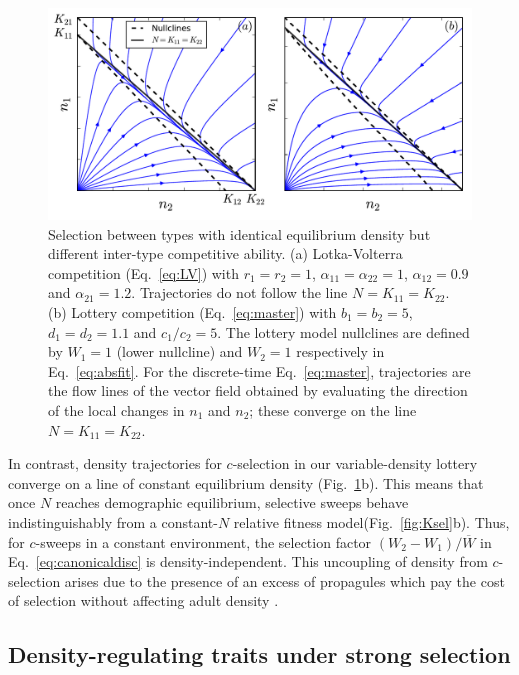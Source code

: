 \documentclass[12pt]{article}
\begin{document}
\begin{figure}
\centering
\includegraphics[scale=0.8]{LVvslottery.pdf}
\caption{\label{fig:LVvslottery} Selection between types with identical equilibrium density but different inter-type competitive ability. (a) Lotka-Volterra competition (Eq.~\ref{eq:LV}) with $r_1=r_2=1$, $\alpha_{11}=\alpha_{22}=1$, $\alpha_{12}=0.9$ and $\alpha_{21}=1.2$. Trajectories do not follow the line $N=K_{11}=K_{22}$. (b) Lottery competition (Eq.~\ref{eq:master}) with $b_1=b_2=5$, $d_1=d_2=1.1$ and $c_1/c_2=5$. The lottery model nullclines are defined by $W_1=1$ (lower nullcline) and $W_2=1$ respectively in Eq.~\eqref{eq:absfit}. For the discrete-time Eq.~\eqref{eq:master}, trajectories are the flow lines of the vector field obtained by evaluating the direction of the local changes in $n_1$ and $n_2$; these converge on the line $N=K_{11}=K_{22}$.}
\end{figure}

In contrast, density trajectories for $c$-selection in our variable-density lottery converge on a line of constant equilibrium density (Fig.~\ref{fig:LVvslottery}b). This means that once $N$ reaches demographic equilibrium, selective sweeps behave indistinguishably from a constant-$N$ relative fitness model(Fig.~\ref{fig:Ksel}b). Thus, for $c$-sweeps in a constant environment, the selection factor $(W_2-W_1)/\overline{W}$ in Eq.~\eqref{eq:canonicaldisc} is density-independent. This uncoupling of density from $c$-selection arises due to the presence of an excess of propagules which pay the cost of selection without affecting adult density \citep{nei1971fertility}. 

\subsection*{Density-regulating traits under strong selection}
\end{document}
